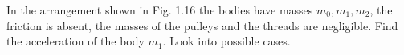 \item In the arrangement shown in Fig. 1.16 the bodies have masses \( m_0, m_1, m_2 \), the friction is absent, the masses of the pulleys and the threads are negligible. Find the acceleration of the body \( m_1 \). Look into possible cases.
    \begin{center}
    \end{center}
